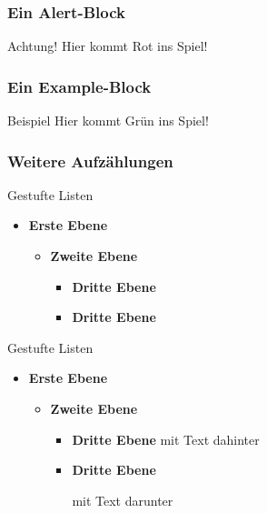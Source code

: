 \documentclass[german, ngerman]{beamer}
\begin{document}
\begin{frame}
	\frametitle{Ein Alert-Block}

	\begin{alertblock}{Achtung!}
		Hier kommt Rot ins Spiel!
	\end{alertblock}
\end{frame}

\begin{frame}
	\frametitle{Ein Example-Block}

	\begin{exampleblock}{Beispiel}
		Hier kommt Grün ins Spiel!
	\end{exampleblock}
\end{frame}

\begin{frame}
	\frametitle{Weitere Aufzählungen}

	Gestufte Listen
	\begin{itemize}
		\item \textbf{Erste Ebene}
		\begin{itemize}
			\item \textbf{Zweite Ebene}
			\begin{itemize}
				\item \textbf{Dritte Ebene}
				\item \textbf{Dritte Ebene}
			\end{itemize}
		\end{itemize}
	\end{itemize}
	Gestufte Listen
	\begin{itemize}
		\item \textbf{Erste Ebene}
		\begin{itemize}
			\item \textbf{Zweite Ebene}
			\begin{itemize}
				\item \textbf{Dritte Ebene} mit Text dahinter
				\item \textbf{Dritte Ebene}

				mit Text darunter
			\end{itemize}
		\end{itemize}
	\end{itemize}
\end{frame}
\end{document}
